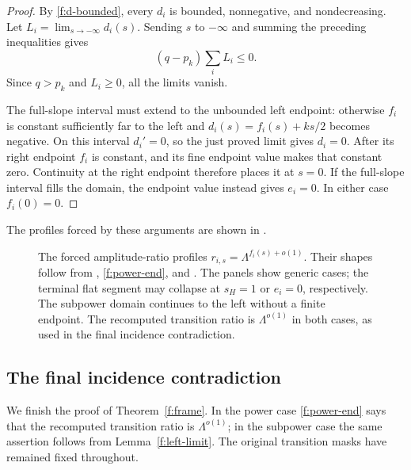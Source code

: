 \begin{proof}
By \eqref{f:d-bounded}, every $d_i$ is bounded, nonnegative, and
nondecreasing. Let $L_i=\lim_{s\to-\infty}d_i(s)$. Sending $s$ to
$-\infty$ and summing the preceding inequalities gives
\[
 (q-p_k)\sum_iL_i\le0.
\]
Since $q>p_k$ and $L_i\ge0$, all the limits vanish.

The full-slope interval must extend to the unbounded left endpoint:
otherwise $f_i$ is constant sufficiently far to the left and
$d_i(s)=f_i(s)+ks/2$ becomes negative. On this interval $d_i'=0$,
so the just proved limit gives $d_i=0$. After its right endpoint
$f_i$ is constant, and its fine endpoint value makes that constant
zero. Continuity at the right endpoint therefore places it at
$s=0$. If the full-slope interval fills the domain, the endpoint
value instead gives $e_i=0$. In either case $f_i(0)=0$.
\end{proof}

The profiles forced by these arguments are shown in
.
\begin{figure}[htbp]
 \centering
 
 \caption{The forced amplitude-ratio profiles
 $r_{i,s}=\Lambda^{f_i(s)+o(1)}$. Their shapes follow from
 , \eqref{f:power-end}, and
 . The panels show generic cases; the terminal
 flat segment may collapse at $s_H=1$ or $e_i=0$, respectively.
 The subpower domain continues to the left without a finite endpoint.
 The recomputed transition ratio is $\Lambda^{o(1)}$ in both cases,
 as used in the final incidence contradiction.}
 \label{f:profiles-figure}
\end{figure}

\subsection{The final incidence contradiction}

We finish the proof of Theorem~\ref{f:frame}. In the power case
\eqref{f:power-end} says that the recomputed transition ratio is
$\Lambda^{o(1)}$; in the subpower case the same assertion follows
from Lemma~\ref{f:left-limit}. The original transition masks have
remained fixed throughout.

